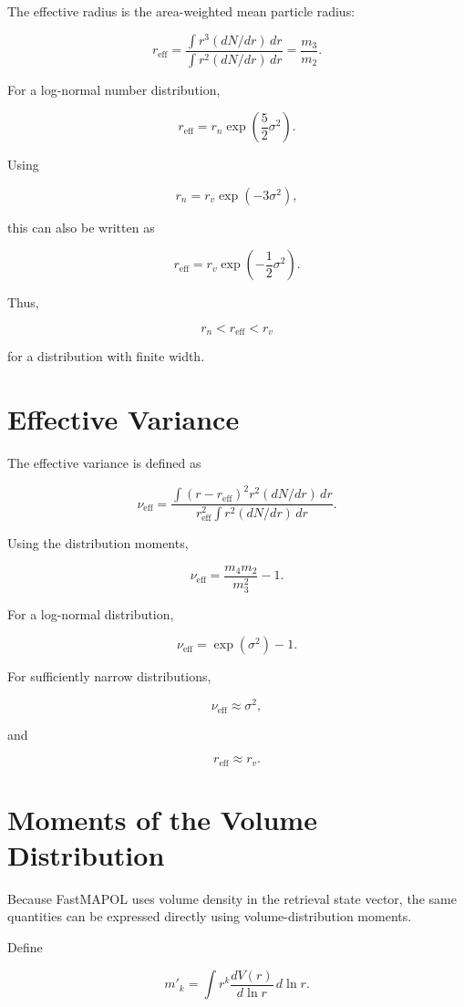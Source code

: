 \documentclass[
  11pt,
  letterpaper,
]{scrreprt}
\begin{document}
The effective radius is the area-weighted mean particle radius:

\[
r_{\mathrm{eff}}
=
\frac{
\int r^3(dN/dr)\,dr
}{
\int r^2(dN/dr)\,dr
}
=
\frac{m_3}{m_2}.
\]

For a log-normal number distribution,

\[
r_{\mathrm{eff}}
=
r_n
\exp
\left(
\frac{5}{2}\sigma^2
\right).
\]

Using

\[
r_n=r_v\exp(-3\sigma^2),
\]

this can also be written as

\[
r_{\mathrm{eff}}
=
r_v
\exp
\left(
-\frac{1}{2}\sigma^2
\right).
\]

Thus,

\[
r_n < r_{\mathrm{eff}} < r_v
\]

for a distribution with finite width.

\section{Effective Variance}\label{effective-variance}

The effective variance is defined as

\[
\nu_{\mathrm{eff}}
=
\frac{
\int
(r-r_{\mathrm{eff}})^2
r^2(dN/dr)\,dr
}{
r_{\mathrm{eff}}^2
\int r^2(dN/dr)\,dr
}.
\]

Using the distribution moments,

\[
\nu_{\mathrm{eff}}
=
\frac{m_4m_2}{m_3^2}-1.
\]

For a log-normal distribution,

\[
\nu_{\mathrm{eff}}
=
\exp(\sigma^2)-1.
\]

For sufficiently narrow distributions,

\[
\nu_{\mathrm{eff}}
\approx
\sigma^2,
\]

and

\[
r_{\mathrm{eff}}
\approx
r_v.
\]

\section{Moments of the Volume
Distribution}\label{moments-of-the-volume-distribution}

Because FastMAPOL uses volume density in the retrieval state vector, the
same quantities can be expressed directly using volume-distribution
moments.

Define

\[
m'_k
=
\int
r^k
\frac{dV(r)}{d\ln r}
\,d\ln r.
\]
\end{document}
